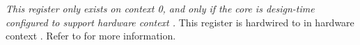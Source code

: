 \implementation{}


\emph{This register only exists on context 0, and only if the core is
design-time configured to support hardware context \n{}.} This register is 
hardwired to  in hardware context \n{}. Refer to  for more
information.

\implementation{}

